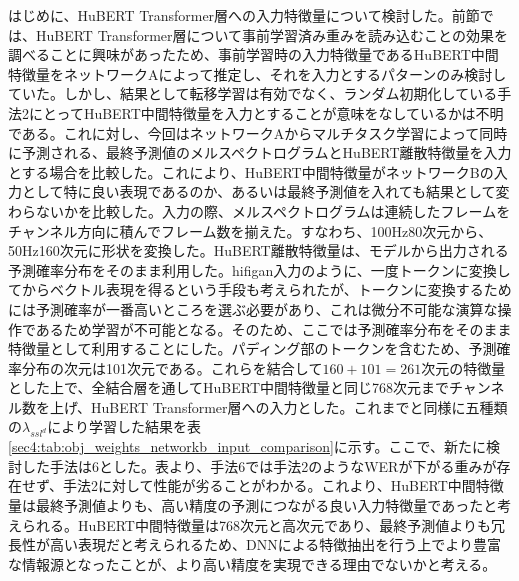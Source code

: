 \documentclass[12pt]{jarticle}
\numberwithin{equation}{section}    %
\numberwithin{figure}{section}      %
\numberwithin{table}{section}      %
\begin{document}
はじめに、HuBERT Transformer層への入力特徴量について検討した。前節では、HuBERT Transformer層について事前学習済み重みを読み込むことの効果を調べることに興味があったため、事前学習時の入力特徴量であるHuBERT中間特徴量をネットワークAによって推定し、それを入力とするパターンのみ検討していた。しかし、結果として転移学習は有効でなく、ランダム初期化している手法2にとってHuBERT中間特徴量を入力とすることが意味をなしているかは不明である。これに対し、今回はネットワークAからマルチタスク学習によって同時に予測される、最終予測値のメルスペクトログラムとHuBERT離散特徴量を入力とする場合を比較した。これにより、HuBERT中間特徴量がネットワークBの入力として特に良い表現であるのか、あるいは最終予測値を入れても結果として変わらないかを比較した。入力の際、メルスペクトログラムは連続したフレームをチャンネル方向に積んでフレーム数を揃えた。すなわち、100Hz80次元から、50Hz160次元に形状を変換した。HuBERT離散特徴量は、モデルから出力される予測確率分布をそのまま利用した。hifigan入力のように、一度トークンに変換してからベクトル表現を得るという手段も考えられたが、トークンに変換するためには予測確率が一番高いところを選ぶ必要があり、これは微分不可能な演算な操作であるため学習が不可能となる。そのため、ここでは予測確率分布をそのまま特徴量として利用することにした。パディング部のトークンを含むため、予測確率分布の次元は101次元である。これらを結合して$160 + 101 = 261$次元の特徴量とした上で、全結合層を通してHuBERT中間特徴量と同じ768次元までチャンネル数を上げ、HuBERT Transformer層への入力とした。これまでと同様に五種類の$\lambda_{ssl^{d}}$により学習した結果を表\ref{sec4:tab:obj_weights_networkb_input_comparison}に示す。ここで、新たに検討した手法は6とした。表より、手法6では手法2のようなWERが下がる重みが存在せず、手法2に対して性能が劣ることがわかる。これより、HuBERT中間特徴量は最終予測値よりも、高い精度の予測につながる良い入力特徴量であったと考えられる。HuBERT中間特徴量は768次元と高次元であり、最終予測値よりも冗長性が高い表現だと考えられるため、DNNによる特徴抽出を行う上でより豊富な情報源となったことが、より高い精度を実現できる理由でないかと考える。
\end{document}

